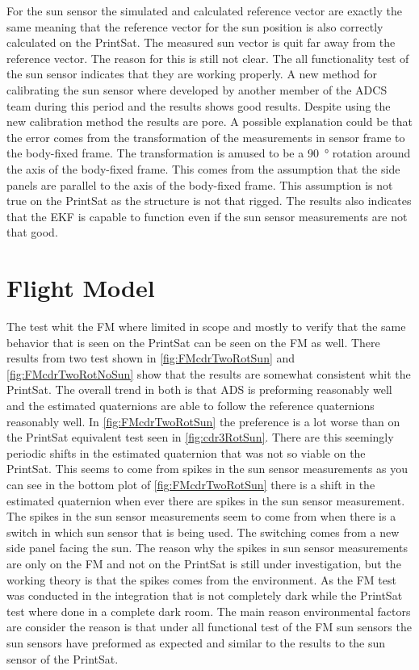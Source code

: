 For the sun sensor the simulated and calculated reference vector are exactly the same meaning that the reference vector for the sun position is also correctly calculated on the PrintSat. The measured sun vector is quit far away from the reference vector. The reason for this is still not clear. The all functionality test of the sun sensor indicates that they are working properly. A new method for calibrating the sun sensor where developed by another member of the ADCS team during this period and the results shows good results. Despite using the new calibration method the results are pore. A possible explanation could be that the error comes from the transformation of the measurements in sensor frame to the body-fixed frame. The transformation is amused to be a \SI{90}{\degree} rotation around the axis of the body-fixed frame. This comes from the assumption that the side panels are parallel to the axis of the body-fixed frame. This assumption is not true on the PrintSat as the structure is not that rigged. The results also indicates that the EKF is capable to function even if the sun sensor measurements are not that good.                      

\section{Flight Model}
The test whit the FM where limited in scope and mostly to verify that the same behavior that is seen on the PrintSat can be seen on the FM as well. There results from two test shown in \autoref{fig:FMcdrTwoRotSun} and \autoref{fig:FMcdrTwoRotNoSun} show that the results are somewhat consistent whit the PrintSat. The overall trend in both is that ADS is preforming reasonably well and the estimated quaternions are able to follow the reference quaternions reasonably well. In \autoref{fig:FMcdrTwoRotSun} the preference is a lot worse than on the PrintSat equivalent test seen in \autoref{fig:cdr3RotSun}. There are this seemingly periodic shifts in the estimated quaternion that was not so viable on the PrintSat. This seems to come from spikes in the sun sensor measurements as you can see in the bottom plot of \autoref{fig:FMcdrTwoRotSun} there is a shift in the estimated quaternion when ever there are spikes in the sun sensor measurement. The spikes in the sun sensor measurements seem to come from when there is a switch in which sun sensor that is being used. The switching comes from  a new side panel facing the sun. The reason why the spikes in sun sensor measurements are only on the FM and not on the PrintSat is still under investigation, but the working theory is that the spikes comes from the environment. As the FM test was conducted in the integration that is not completely dark while the PrintSat test where done in a complete dark room. The main reason environmental factors are consider the reason is that under all functional test of the FM sun sensors the sun sensors have preformed as expected and similar to the results to the sun sensor of the PrintSat.   

